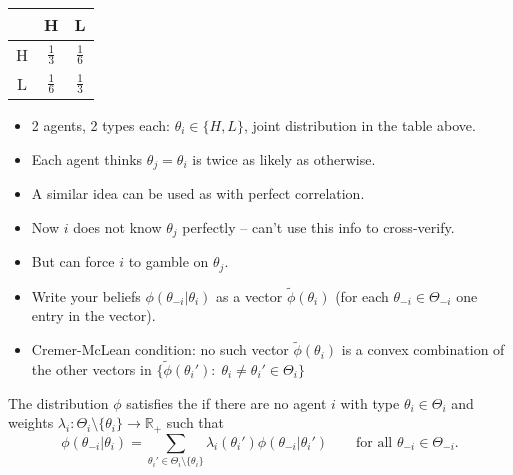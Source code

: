 \documentclass[english,handout]{beamer}		%
\def\lyxframeend{} %
\begin{document}
\begin{example}[2x2 example]
	\begin{center}
		\begin{tabular}{c | c | c |}
			& H 				& L					\\ \hline
			H	& $\frac{1}{3}$ 	& $\frac{1}{6}$ 	\\ \hline
			L	& $\frac{1}{6}$ 	& $\frac{1}{3}$		\\ \hline
		\end{tabular}
	\end{center}
	\begin{itemize}
		\item 2 agents, 2 types each: $\theta_i \in \{H,L\}$, joint distribution in the table above.
		\item Each agent thinks $\theta_j = \theta_i$ is twice as likely as otherwise. 
	\end{itemize}
\end{example}
\lyxframeend


\begin{itemize}
	\item A similar idea can be used as with perfect correlation.
	\item Now $i$ does not know $\theta_j$ perfectly -- can't use this info to cross-verify.
	\item But can force $i$ to gamble on $\theta_j$.
\end{itemize}
\lyxframeend


\begin{itemize}
	\item Write your beliefs $\phi(\theta_{-i}|\theta_i)$ as a vector $\tilde\phi(\theta_i)$ (for each $\theta_{-i}\in\Theta_{-i}$ one entry in the vector).
	\item Cremer-McLean condition: no such vector $\tilde\phi(\theta_i)$ is a convex combination of the other vectors in $\{\tilde\phi(\theta_i'):\;\theta_i\neq\theta_i'\in\Theta_i\}$
\end{itemize}

\begin{definition}[CM condition]
	The distribution $\phi$ satisfies the  if there are no agent $i$ with type $\theta_i\in\Theta_i$ and weights $\lambda_i: \Theta_i\setminus\{\theta_i\} \to \mathbb{R}_+$ such that
	\begin{equation*}
	\phi(\theta _{-i}|\theta _i)=\sum_{\theta _i'\in\Theta_i\setminus\{\theta_i\}}\lambda_i(\theta_i')\phi(\theta_{-i}|\theta_i')\qquad\text{for all }\theta_{-i}\in\Theta_{-i}.
	\end{equation*}
\end{definition}
\vspace{-2ex}
\lyxframeend
\end{document}
